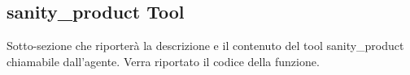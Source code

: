 \subsection{sanity\_product Tool}

Sotto-sezione che riporterà la descrizione e il contenuto del tool sanity\_product chiamabile dall'agente.
Verra riportato il codice della funzione.